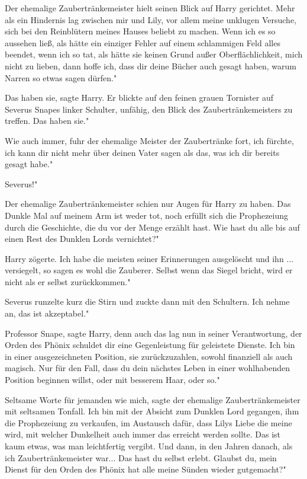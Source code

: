 Der ehemalige Zaubertränkemeister hielt seinen Blick auf Harry gerichtet. \glqq
Mehr als ein Hindernis lag zwischen mir und Lily, vor allem meine unklugen
Versuche, sich bei den Reinblütern meines Hauses beliebt zu machen. Wenn ich es
so aussehen ließ, als hätte ein einziger Fehler auf einem schlammigen Feld alles
beendet, wenn ich so tat, als hätte sie keinen Grund außer Oberflächlichkeit,
mich nicht zu lieben, dann hoffe ich, dass dir deine Bücher auch gesagt haben,
warum Narren so etwas sagen dürfen."

\glqq Das haben sie\grqq{}, sagte Harry. Er blickte auf den feinen grauen
Tornister auf Severus Snapes linker Schulter, unfähig, den Blick des
Zaubertränkemeisters zu treffen. \glqq Das haben sie."

\glqq Wie auch immer\grqq{}, fuhr der ehemalige Meister der Zaubertränke fort,
\glqq ich fürchte, ich kann dir nicht mehr über deinen Vater sagen als das, was
ich dir bereits gesagt habe."

\glqq Severus!"

Der ehemalige Zaubertränkemeister schien nur Augen für Harry zu haben. \glqq Das
Dunkle Mal auf meinem Arm ist weder tot, noch erfüllt sich die Prophezeiung
durch die Geschichte, die du vor der Menge erzählt hast. Wie hast du alle bis
auf einen Rest des Dunklen Lords vernichtet?"

Harry zögerte. \glqq Ich habe die meisten seiner Erinnerungen ausgelöscht und
ihn ... versiegelt, so sagen es wohl die Zauberer. Selbst wenn das Siegel
bricht, wird er nicht als er selbst zurückkommen."

Severus runzelte kurz die Stirn und zuckte dann mit den Schultern. \glqq Ich
nehme an, das ist akzeptabel."

\glqq Professor Snape\grqq{}, sagte Harry, denn auch das lag nun in seiner
Verantwortung, \glqq der Orden des Phönix schuldet dir eine Gegenleistung für
geleistete Dienste. Ich bin in einer ausgezeichneten Position, sie
zurückzuzahlen, sowohl finanziell als auch magisch. Nur für den Fall, dass du
dein nächstes Leben in einer wohlhabenden Position beginnen willst, oder mit
besserem Haar, oder so."

\glqq Seltsame Worte für jemanden wie mich\grqq{}, sagte der ehemalige
Zaubertränkemeister mit seltsamen Tonfall. \glqq Ich bin mit der Absicht zum
Dunklen Lord gegangen, ihm die Prophezeiung zu verkaufen, im Austausch dafür,
dass Lilys Liebe die meine wird, mit welcher Dunkelheit auch immer das erreicht
werden sollte. Das ist kaum etwas, was man leichtfertig vergibt. Und dann, in
den Jahren danach, als ich Zaubertränkemeister war... Das hast du selbst erlebt.
Glaubst du, mein Dienst für den Orden des Phönix hat alle meine Sünden wieder
gutgemacht?"


